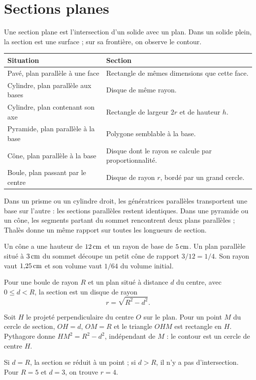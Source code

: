 \documentclass[../cours_3e.tex]{subfiles}
\begin{document}
\section{Sections planes}
\begin{definition}
Une section plane est l'intersection d'un solide avec un plan. Dans un solide plein, la section est une surface ; sur sa frontière, on observe le contour.
\end{definition}
\begin{center}
\begin{tabularx}{\textwidth}{lX}
\toprule Situation & Section\\\midrule
Pavé, plan parallèle à une face & Rectangle de mêmes dimensions que cette face.\\
Cylindre, plan parallèle aux bases & Disque de même rayon.\\
Cylindre, plan contenant son axe & Rectangle de largeur $2r$ et de hauteur $h$.\\
Pyramide, plan parallèle à la base & Polygone semblable à la base.\\
Cône, plan parallèle à la base & Disque dont le rayon se calcule par proportionnalité.\\
Boule, plan passant par le centre & Disque de rayon $r$, bordé par un grand cercle.\\\bottomrule
\end{tabularx}
\end{center}
\begin{justification}
Dans un prisme ou un cylindre droit, les génératrices parallèles transportent une base sur l'autre : les sections parallèles restent identiques. Dans une pyramide ou un cône, les segments partant du sommet rencontrent deux plans parallèles ; Thalès donne un même rapport sur toutes les longueurs de section.
\end{justification}
\begin{exemple}
Un cône a une hauteur de $12\,\mathrm{cm}$ et un rayon de base de $5\,\mathrm{cm}$. Un plan parallèle situé à $3\,\mathrm{cm}$ du sommet découpe un petit cône de rapport $3/12=1/4$. Son rayon vaut $1{,}25\,\mathrm{cm}$ et son volume vaut $1/64$ du volume initial.
\end{exemple}
\begin{theoreme}
Pour une boule de rayon $R$ et un plan situé à distance $d$ du centre, avec $0\leq d<R$, la section est un disque de rayon
\[r=\sqrt{R^2-d^2}.\]
\end{theoreme}
\begin{demonstration}
Soit $H$ le projeté perpendiculaire du centre $O$ sur le plan. Pour un point $M$ du cercle de section, $OH=d$, $OM=R$ et le triangle $OHM$ est rectangle en $H$. Pythagore donne $HM^2=R^2-d^2$, indépendant de $M$ : le contour est un cercle de centre $H$.
\end{demonstration}
Si $d=R$, la section se réduit à un point ; si $d>R$, il n'y a pas d'intersection. Pour $R=5$ et $d=3$, on trouve $r=4$.
\end{document}
